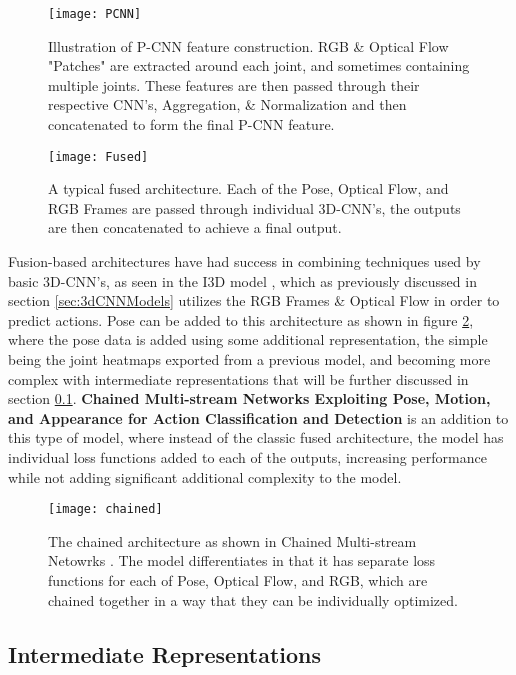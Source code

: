 \begin{figure}[ht]
	\texttt{[image: PCNN]}
	\centering
	\caption{Illustration of P-CNN \cite{PCNN} feature construction. RGB \& Optical Flow "Patches" are extracted around each joint, and sometimes containing multiple joints. These features are then passed through their respective CNN's, Aggregation, \& Normalization and then concatenated to form the final P-CNN feature.}
	\label{fig:pcnn}
\end{figure}

\begin{figure}[ht]
	\texttt{[image: Fused]}
	\centering
	\caption{A typical fused architecture. Each of the Pose, Optical Flow, and RGB Frames are passed through individual 3D-CNN's, the outputs are then concatenated to achieve a final output.}
	\label{fig:fused}
\end{figure}

Fusion-based architectures have had success in combining techniques used by basic 3D-CNN's, as seen in the I3D model \cite{i3d}, which as previously discussed in section \ref{sec:3dCNNModels} utilizes the RGB Frames \& Optical Flow in order to predict actions. Pose can be added to this architecture as shown in figure \ref{fig:fused}, where the pose data is added using some additional representation, the simple being the joint heatmaps exported from a previous model, and becoming more complex with intermediate representations that will be further discussed in section \ref{sec:intermediate}. \textbf{Chained Multi-stream Networks Exploiting Pose, Motion, and Appearance for Action Classification and Detection} \cite{Chained} is an addition to this type of model, where instead of the classic fused architecture, the model has individual loss functions added to each of the outputs, increasing performance while not adding significant additional complexity to the model.

\begin{figure}[ht]
	\texttt{[image: chained]}
	\centering
	\caption{The chained architecture as shown in Chained Multi-stream Netowrks \cite{Chained}. The model differentiates in that it has separate loss functions for each of Pose, Optical Flow, and RGB, which are chained together in a way that they can be individually optimized.}
	\label{fig:chained}
\end{figure}

\subsection{Intermediate Representations}
\label{sec:intermediate}

